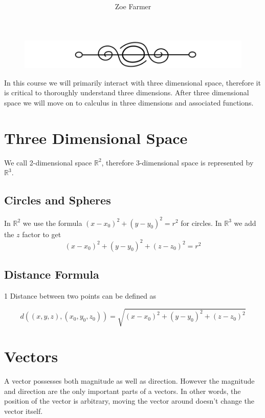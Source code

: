 \documentclass{article}
\begin{document}
\title{ }
\author{Zoe Farmer}
\maketitle

\tableofcontents
{}
\listoffigures
{}

\begin{figure}[h]
    \centering
    \includegraphics[scale=0.25]{break.png}
\end{figure}

In this course we will primarily interact with three dimensional space, therefore it is critical to thoroughly understand three dimensions. After three dimensional space we will move on to calculus in three dimensions and associated functions.

\section{Three Dimensional Space}
We call 2-dimensional space $ \mathbb{R}^2 $, therefore 3-dimensional space is represented by $ \mathbb{R}^3 $.

    \subsection{Circles and Spheres}
    In $\mathbb{R}^2$ we use the formula $(x-x_0)^2+(y-y_0)^2=r^2$ for circles. In $\mathbb{R}^3$ we add the $z$ factor to get
    \begin{equation}
    (x-x_0)^2+(y-y_0)^2+(z-z_0)^2=r^2
    \end{equation}

    \subsection{Distance Formula}1
    Distance between two points can be defined as

    \begin{equation}
    d((x, y, z), (x_0, y_0, z_0)) = \sqrt{(x - x_0)^2 + (y - y_0)^2 + (z - z_0)^2}
    \end{equation}

\section{Vectors}
A vector possesses both magnitude as well as direction. However the magnitude and direction are the only important parts of a vectors. In other words, the position of the vector is arbitrary, moving the vector around doesn't change the vector itself.
\end{document}

